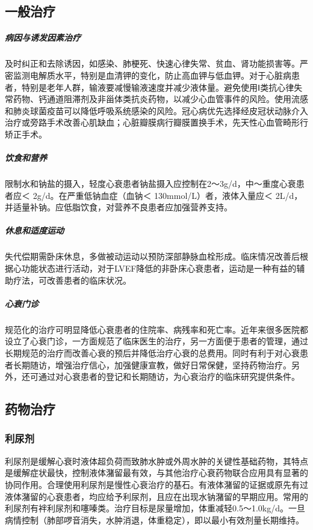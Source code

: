 \subsection{一般治疗}

\subparagraph{病因与诱发因素治疗}

及时纠正和去除诱因，如感染、肺梗死、快速心律失常、贫血、肾功能损害等。严密监测电解质水平，特别是血清钾的变化，防止高血钾与低血钾。对于心脏病患者，特别是老年人群，输液要减慢输液速度并减少液体量。避免使用Ⅰ类抗心律失常药物、钙通道阻滞剂及非甾体类抗炎药物，以减少心血管事件的风险。使用流感和肺炎球菌疫苗可以降低呼吸系统感染的风险。冠心病优先选择经皮冠状动脉介入治疗或旁路手术改善心肌缺血；心脏瓣膜病行瓣膜置换手术，先天性心血管畸形行矫正手术。

\subparagraph{饮食和营养}

限制水和钠盐的摄入，轻度心衰患者钠盐摄入应控制在2～3g/d，中～重度心衰患者应＜
2g/d。在严重低钠血症（血钠＜ 130mmol/L）者，液体入量应＜
2L/d，并适量补钠。应低脂饮食，对营养不良患者应加强营养支持。

\subparagraph{休息和适度运动}

失代偿期需卧床休息，多做被动运动以预防深部静脉血栓形成。临床情况改善后根据心功能状态进行活动，对于LVEF降低的非卧床心衰患者，运动是一种有益的辅助疗法，可改善患者的临床状况。

\subparagraph{心衰门诊}

规范化的治疗可明显降低心衰患者的住院率、病残率和死亡率。近年来很多医院都设立了心衰门诊，一方面规范了临床医生的治疗，另一方面便于患者的管理，通过长期规范的治疗而改善心衰的预后并降低治疗心衰的总费用。同时有利于对心衰患者长期随访，增强治疗信心，加强健康宣教，做好日常保健，坚持药物治疗。另外，还可通过对心衰患者的登记和长期随访，为心衰治疗的临床研究提供条件。

\subsection{药物治疗}

\subsubsection{利尿剂}

利尿剂是缓解心衰时液体超负荷而致肺水肿或外周水肿的关键性基础药物，其特点是缓解症状最快，控制液体潴留最有效，与其他治疗心衰药物联合应用具有显著的协同作用。合理使用利尿剂是慢性心衰治疗的基石。有液体潴留的证据或原先有过液体潴留的心衰患者，均应给予利尿剂，且应在出现水钠潴留的早期应用。常用的利尿剂有袢利尿剂和噻嗪类。治疗目标是尿量增加，体重减轻0.5～1.0kg/d。一旦病情控制（肺部啰音消失，水肿消退，体重稳定），即以最小有效剂量长期维持。

